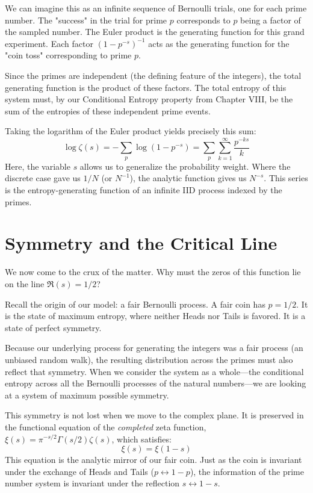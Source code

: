\documentclass[12pt]{article}
\begin{document}
We can imagine this as an infinite sequence of Bernoulli trials, one for each prime number. The "success" in the trial for prime $p$ corresponds to $p$ being a factor of the sampled number. The Euler product is the generating function for this grand experiment. Each factor $(1-p^{-s})^{-1}$ acts as the generating function for the "coin toss" corresponding to prime $p$.

Since the primes are independent (the defining feature of the integers), the total generating function is the product of these factors. The total entropy of this system must, by our Conditional Entropy property from Chapter VIII, be the sum of the entropies of these independent prime events.

Taking the logarithm of the Euler product yields precisely this sum:
\begin{equation}
\log \zeta(s) = -\sum_{p} \log(1 - p^{-s}) = \sum_{p}\sum_{k=1}^{\infty} \frac{p^{-ks}}{k}
\end{equation}
Here, the variable $s$ allows us to generalize the probability weight. Where the discrete case gave us $1/N$ (or $N^{-1}$), the analytic function gives us $N^{-s}$. This series is the entropy-generating function of an infinite IID process indexed by the primes.

\section{Symmetry and the Critical Line}

We now come to the crux of the matter. Why must the zeros of this function lie on the line $\Re(s) = 1/2$?

Recall the origin of our model: a fair Bernoulli process. A fair coin has $p = 1/2$. It is the state of maximum entropy, where neither Heads nor Tails is favored. It is a state of perfect symmetry.

Because our underlying process for generating the integers was a fair process (an unbiased random walk), the resulting distribution across the primes must also reflect that symmetry. When we consider the system as a whole—the conditional entropy across all the Bernoulli processes of the natural numbers—we are looking at a system of maximum possible symmetry.

This symmetry is not lost when we move to the complex plane. It is preserved in the functional equation of the \textit{completed} zeta function, $\xi(s) = \pi^{-s/2}\Gamma(s/2)\zeta(s)$, which satisfies:
\begin{equation}
\xi(s) = \xi(1-s)
\end{equation}
This equation is the analytic mirror of our fair coin. Just as the coin is invariant under the exchange of Heads and Tails ($p \leftrightarrow 1-p$), the information of the prime number system is invariant under the reflection $s \leftrightarrow 1-s$.
\end{document}
